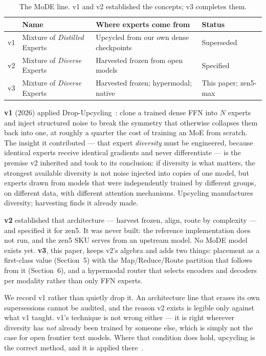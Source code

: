 \documentclass[11pt,a4paper]{article}
\begin{document}
\begin{table}[H]
\centering
\caption{The MoDE line. v1 and v2 established the concepts; v3 completes them.}
\begin{tabular}{llll}
\toprule
& \textbf{Name} & \textbf{Where experts come from} & \textbf{Status} \\
\midrule
v1 & Mixture of \emph{Distilled} Experts & Upcycled from our own dense checkpoints & Superseded \\
v2 & Mixture of \emph{Diverse} Experts    & Harvested frozen from open models      & Specified \\
v3 & Mixture of \emph{Diverse} Experts    & Harvested frozen; hypermodal; native   & This paper; zen5-max \\
\bottomrule
\end{tabular}
\end{table}

\textbf{v1} (2026) applied Drop-Upcycling~\cite{dropupcycling}: clone a trained dense FFN into $N$
experts and inject structured noise to break the symmetry that otherwise collapses them back into
one, at roughly a quarter the cost of training an MoE from scratch. The insight it contributed ---
that expert \emph{diversity} must be engineered, because identical experts receive identical
gradients and never differentiate --- is the premise v2 inherited and took to its conclusion: if
diversity is what matters, the strongest available diversity is not noise injected into copies of
one model, but experts drawn from models that were independently trained by different groups, on
different data, with different attention mechanisms. Upcycling manufactures diversity; harvesting
finds it already made.

\textbf{v2} established that architecture --- harvest frozen, align, route by complexity ---
and specified it for zen5. It was never built: the reference implementation does not run, and
the zen5 SKU serves from an upstream model. No MoDE model exists yet.
\textbf{v3}, this paper, keeps v2's algebra and adds two things: placement as a first-class value
(Section~5) with the Map/Reduce/Route partition that follows from it (Section~6), and a hypermodal
router that selects encoders and decoders per modality rather than only FFN experts.

We record v1 rather than quietly drop it. An architecture line that erases its own supersessions
cannot be audited, and the reason v2 exists is legible only against what v1 taught. v1's technique
is not wrong either --- it is right wherever diversity has \emph{not} already been trained by
someone else, which is simply not the case for open frontier text models. Where that condition does
hold, upcycling is the correct method, and it is applied there~\cite{muen}.
\end{document}
